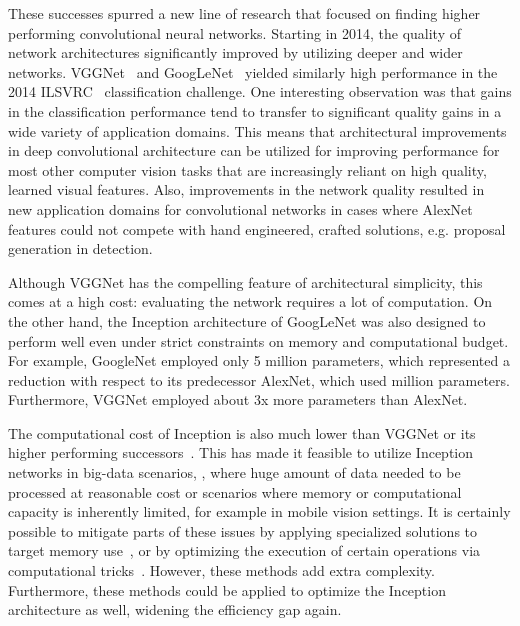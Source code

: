 \documentclass[10pt,twocolumn,letterpaper]{article}
\begin{document}
These successes spurred a new line of research that focused on finding
higher performing convolutional neural networks. Starting in 2014, the
quality of network architectures significantly improved
by utilizing deeper and wider networks. VGGNet~\cite{simonyan2014very} and
GoogLeNet~\cite{szegedy2015going}
yielded similarly high performance in the 2014 ILSVRC~\cite{russakovsky2014imagenet}
classification challenge. One interesting observation was that gains in the
classification performance tend to transfer to significant quality gains in a
wide variety of application domains. This means that architectural improvements
in deep convolutional architecture can be utilized for improving performance for
most other computer vision tasks that are increasingly reliant on high quality,
learned visual features.
Also, improvements in the network quality resulted in new application
domains for convolutional networks in cases where AlexNet features
could not compete with hand engineered, crafted solutions,
e.g. proposal generation in detection\cite{erhan2014scalable}.

Although VGGNet \cite{simonyan2014very} has the compelling feature
of architectural simplicity, this comes at a high cost: evaluating the
network requires a lot of computation. On the other hand, the Inception
architecture of GoogLeNet \cite{szegedy2015going} was also designed to
perform well even under strict constraints on memory and computational budget.
For example, GoogleNet employed only 5 million parameters,
which represented a  reduction with respect to its predecessor
AlexNet, which used  million parameters.
Furthermore, VGGNet employed about 3x more parameters than AlexNet.

The computational cost of Inception is also much lower than VGGNet or its
higher performing successors~\cite{he2015delving}. This has made it feasible to
utilize Inception networks in big-data scenarios\cite{schroff2015facenet},
\cite{movshovitz2015ontological}, where huge amount of data needed to be
processed at reasonable cost or scenarios where memory or
computational capacity is inherently limited, for example in mobile vision
settings.
It is certainly possible to mitigate parts of these issues by applying
specialized solutions to target memory use~\cite{chen2015compressing},
\cite{psichogios1993svd}
or by optimizing the execution of certain operations via computational
tricks~\cite{lavin2015fast}. However, these methods add extra complexity.
Furthermore, these methods could be applied to optimize the
Inception architecture
as well, widening the efficiency gap again.
\end{document}
